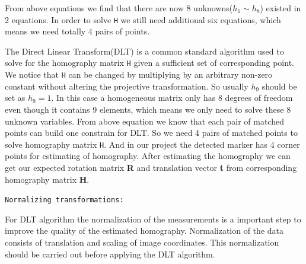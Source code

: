 From above equations we find that there are now 8 unknowns($h_1 \sim h_8$) existed in 2 equations. In order to solve \texttt{H} we still need additional six equations, which means we need totally 4 pairs of points.

The Direct Linear Transform(DLT) is a common standard algorithm used
to solve for the homography matrix \texttt{H} given a sufficient set of corresponding point.
We notice that \texttt{H} can be changed by multiplying by an arbitrary
non-zero constant without altering the projective transformation. So usually $h_9$ should be set as $h_9 = 1$. In this case a homogeneous matrix only has 8 degrees of freedom even
though it contains 9 elements, which means we only need to solve these 8 unknown variables. From above equation we know that each pair of matched points can build one constrain for DLT. So we need 4 pairs of matched points to solve homography matrix \texttt{H}. And in our project the detected marker has 4 corner points for estimating of homography.
After estimating the homography we can get our expected rotation matrix \textbf{R} and translation vector \textbf{t} from corresponding homography matrix \textbf{H}.

\texttt{Normalizing transformations:}

For DLT algorithm the normalization of the measurements is a important step to improve the quality of the estimated homography. Normalization of the data consists of translation and scaling of image coordinates. This normalization should be carried out before applying the DLT algorithm.

